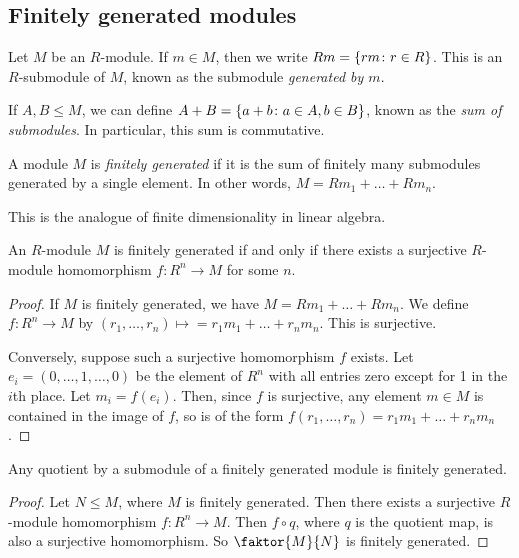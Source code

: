 \subsection{Finitely generated modules}
\begin{definition}
	Let \( M \) be an \( R \)-module.
	If \( m \in M \), then we write \( Rm = \qty{rm \colon r \in R} \).
	This is an \( R \)-submodule of \( M \), known as the submodule \textit{generated by \( m \)}.

	If \( A, B \leq M \), we can define \( A + B = \qty{a + b \colon a \in A, b \in B} \), known as the \textit{sum of submodules}.
	In particular, this sum is commutative.
\end{definition}
\begin{definition}
	A module \( M \) is \textit{finitely generated} if it is the sum of finitely many submodules generated by a single element.
	In other words, \( M = Rm_1 + \dots + Rm_n \).
\end{definition}
This is the analogue of finite dimensionality in linear algebra.
\begin{lemma}
	An \( R \)-module \( M \) is finitely generated if and only if there exists a surjective \( R \)-module homomorphism \( f \colon R^n \to M \) for some \( n \).
\end{lemma}
\begin{proof}
	If \( M \) is finitely generated, we have \( M = Rm_1 + \dots + Rm_n \).
	We define \( f \colon R^n \to M \) by \( (r_1, \dots, r_n) \mapsto = r_1 m_1 + \dots + r_n m_n \).
	This is surjective.

	Conversely, suppose such a surjective homomorphism \( f \) exists.
	Let \( e_i = (0, \dots, 1, \dots, 0) \) be the element of \( R^n \) with all entries zero except for 1 in the \( i \)th place.
	Let \( m_i = f(e_i) \).
	Then, since \( f \) is surjective, any element \( m \in M \) is contained in the image of \( f \), so is of the form \( f(r_1, \dots, r_n) = r_1 m_1 + \dots + r_n m_n \).
\end{proof}
\begin{corollary}
	Any quotient by a submodule of a finitely generated module is finitely generated.
\end{corollary}
\begin{proof}
	Let \( N \leq M \), where \( M \) is finitely generated.
	Then there exists a surjective \( R \)-module homomorphism \( f \colon R^n \to M \).
	Then \( f \circ q \), where \( q \) is the quotient map, is also a surjective homomorphism.
	So \( \faktor{M}{N} \) is finitely generated.
\end{proof}
